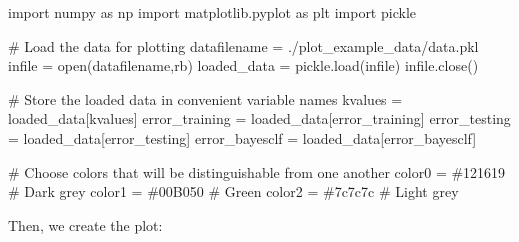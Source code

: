 \documentclass[
  letterpaper,
  DIV=11,
  numbers=noendperiod]{scrartcl}
\newenvironment{Shaded}{\begin{snugshade}}{\end{snugshade}}
\newcommand{\BuiltInTok}[1]{\textcolor[rgb]{0.00,0.23,0.31}{#1}}
\newcommand{\CommentTok}[1]{\textcolor[rgb]{0.37,0.37,0.37}{#1}}
\newcommand{\ImportTok}[1]{\textcolor[rgb]{0.00,0.46,0.62}{#1}}
\newcommand{\NormalTok}[1]{\textcolor[rgb]{0.00,0.23,0.31}{#1}}
\newcommand{\OperatorTok}[1]{\textcolor[rgb]{0.37,0.37,0.37}{#1}}
\newcommand{\StringTok}[1]{\textcolor[rgb]{0.13,0.47,0.30}{#1}}
\begin{document}
\begin{Shaded}
\begin{Highlighting}[]
\ImportTok{import}\NormalTok{ numpy }\ImportTok{as}\NormalTok{ np}
\ImportTok{import}\NormalTok{ matplotlib.pyplot }\ImportTok{as}\NormalTok{ plt}
\ImportTok{import}\NormalTok{ pickle}

\CommentTok{\# Load the data for plotting}
\NormalTok{datafilename }\OperatorTok{=} \StringTok{\textquotesingle{}./plot\_example\_data/data.pkl\textquotesingle{}}
\NormalTok{infile }\OperatorTok{=} \BuiltInTok{open}\NormalTok{(datafilename,}\StringTok{\textquotesingle{}rb\textquotesingle{}}\NormalTok{)}
\NormalTok{loaded\_data }\OperatorTok{=}\NormalTok{ pickle.load(infile)}
\NormalTok{infile.close()}

\CommentTok{\# Store the loaded data in convenient variable names}
\NormalTok{kvalues }\OperatorTok{=}\NormalTok{ loaded\_data[}\StringTok{\textquotesingle{}kvalues\textquotesingle{}}\NormalTok{]}
\NormalTok{error\_training }\OperatorTok{=}\NormalTok{ loaded\_data[}\StringTok{\textquotesingle{}error\_training\textquotesingle{}}\NormalTok{]}
\NormalTok{error\_testing }\OperatorTok{=}\NormalTok{ loaded\_data[}\StringTok{\textquotesingle{}error\_testing\textquotesingle{}}\NormalTok{]}
\NormalTok{error\_bayesclf }\OperatorTok{=}\NormalTok{ loaded\_data[}\StringTok{\textquotesingle{}error\_bayesclf\textquotesingle{}}\NormalTok{]}

\CommentTok{\# Choose colors that will be distinguishable from one another}
\NormalTok{color0 }\OperatorTok{=} \StringTok{\textquotesingle{}\#121619\textquotesingle{}} \CommentTok{\# Dark grey}
\NormalTok{color1 }\OperatorTok{=} \StringTok{\textquotesingle{}\#00B050\textquotesingle{}} \CommentTok{\# Green}
\NormalTok{color2 }\OperatorTok{=} \StringTok{\textquotesingle{}\#7c7c7c\textquotesingle{}} \CommentTok{\# Light grey}
\end{Highlighting}
\end{Shaded}

Then, we create the plot:
\end{document}
